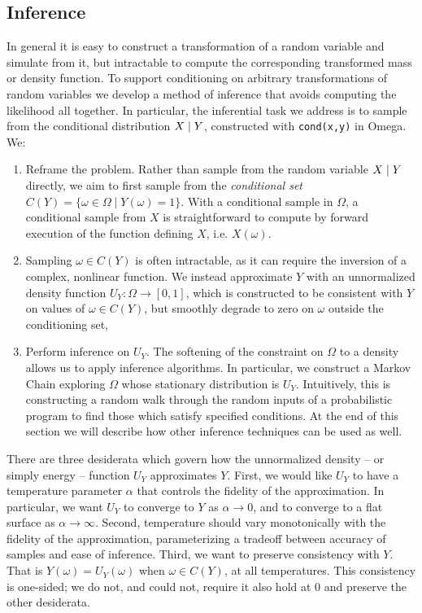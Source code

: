 
\subsection{Inference}
In general it is easy to construct a transformation of a random variable 
and simulate from it, but intractable to compute the corresponding transformed mass or density function. 
To support conditioning on arbitrary transformations of random variables we develop a method of inference that avoids computing the likelihood all together.
In particular, the inferential task we address is to sample from the conditional distribution $X \mid Y$, constructed with \texttt{cond(x,y)} in Omega.
We:
\begin{enumerate}
	\item Reframe the problem. Rather than sample from the random variable $X \mid Y$ directly, we aim to first sample from the \emph{conditional set} $C(Y) = \{ \omega \in \Omega \mid Y(\omega) = 1 \}$. 
With a conditional sample in $\Omega$, a conditional sample from $X$ is straightforward to compute by forward execution of the function defining $X$, i.e. $X(\omega)$.
\item Sampling $\omega \in C(Y)$ is often intractable, as it can require the inversion of a complex, nonlinear function.
We instead approximate $Y$ with an unnormalized density function $U_Y: \Omega \to [0, 1]$, which is constructed to be consistent with $Y$ on values of $\omega \in C(Y)$, but smoothly degrade to zero on $\omega$ outside the conditioning set,  
\item Perform inference on $U_Y$.  The softening of the constraint on $\Omega$ to a density allows us to apply inference algorithms.  In particular, we construct a Markov Chain exploring $\Omega$ whose stationary distribution is $U_Y$.  Intuitively, this is constructing a random walk through the random inputs of a probabilistic program to find those which satisfy specified conditions. At the end of this section we will describe how other inference techniques can be used as well.
\end{enumerate}

There are three desiderata which govern how the unnormalized density -- or simply energy -- function  $U_Y$ approximates $Y$.  First, we would like $U_Y$ to have a temperature parameter $\alpha$ that controls the fidelity
of the approximation. In particular, we want $U_Y$ to converge to $Y$ as $\alpha \to 0$, and to converge to a flat surface as $\alpha \to \infty$. Second, temperature should vary monotonically with the fidelity of the approximation, parameterizing a tradeoff between accuracy of samples and ease of inference. Third, we want to preserve consistency with $Y$. That is $Y(\omega) = U_Y(\omega)$ when $\omega \in C(Y)$, at all temperatures.  This consistency is one-sided; we do not, and could not, require it also hold at 0 and preserve the other desiderata.

